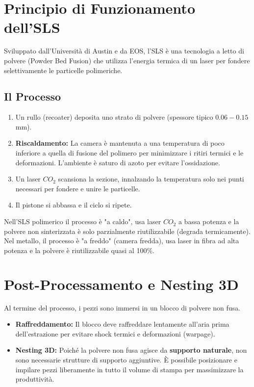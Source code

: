 %
\section{Principio di Funzionamento dell'SLS}
Sviluppato dall'Università di Austin e da EOS, l'SLS è una tecnologia a letto di polvere (Powder Bed Fusion) che utilizza l'energia termica di un laser per fondere selettivamente le particelle polimeriche.

\subsection{Il Processo}
\begin{enumerate}
    \item Un rullo (recoater) deposita uno strato di polvere (spessore tipico $0.06 - 0.15$ mm).
    \item \textbf{Riscaldamento:} La camera è mantenuta a una temperatura di poco inferiore a quella di fusione del polimero per minimizzare i ritiri termici e le deformazioni. L'ambiente è saturo di azoto per evitare l'ossidazione.
    \item Un laser $CO_2$ scansiona la sezione, innalzando la temperatura solo nei punti necessari per fondere e unire le particelle.
    \item Il pistone si abbassa e il ciclo si ripete.
\end{enumerate}

\begin{note}
    Nell'SLS polimerico il processo è "a caldo", usa laser $CO_2$ a bassa potenza e la polvere non sinterizzata è solo parzialmente riutilizzabile (degrada termicamente). Nel metallo, il processo è "a freddo" (camera fredda), usa laser in fibra ad alta potenza e la polvere è riutilizzabile quasi al 100\%.
\end{note}

%
\section{Post-Processamento e Nesting 3D}
Al termine del processo, i pezzi sono immersi in un blocco di polvere non fusa.
\begin{itemize}
    \item \textbf{Raffreddamento:} Il blocco deve raffreddare lentamente all'aria prima dell'estrazione per evitare shock termici e deformazioni (warpage).
    \item \textbf{Nesting 3D:} Poiché la polvere non fusa agisce da \textbf{supporto naturale}, non sono necessarie strutture di supporto aggiuntive. È possibile posizionare e impilare pezzi liberamente in tutto il volume di stampa per massimizzare la produttività.
\end{itemize}

